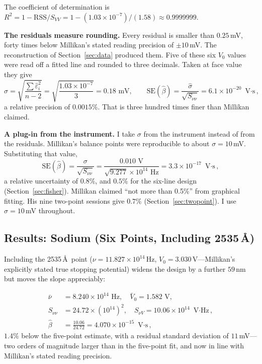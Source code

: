 \documentclass[12pt]{article}
\begin{document}
\noindent The coefficient of determination is
$R^2 = 1 - \mathrm{RSS}/S_{VV} = 1 - (1.03\times10^{-7})/(1.58) \approx
0.9999999$.

\medskip\noindent\textbf{The residuals measure rounding.}
Every residual is smaller than $0.25$\,mV, forty times below Millikan's
stated reading precision of $\pm10$\,mV.  The reconstruction of
Section~\ref{sec:data} produced them.  Five of these six $V_0$ values were
read off a fitted line and rounded to three decimals.  Taken at face value
they give
\[
  \hat\sigma = \sqrt{\frac{\sum\hat\varepsilon_i^2}{n-2}}
  = \sqrt{\frac{1.03\times10^{-7}}{3}} = 0.18\text{ mV},
  \qquad
  \mathrm{SE}(\hat\beta) = \frac{\hat\sigma}{\sqrt{S_{\nu\nu}}}
  = 6.1\times10^{-20}\text{ V$\cdot$s},
\]
a relative precision of $0.0015\%$.  That is three hundred times finer than
Millikan claimed.

\medskip\noindent\textbf{A plug-in from the instrument.}
I take $\sigma$ from the instrument instead of from the residuals.  Millikan's
balance points were reproducible to about $\sigma = 10$\,mV.  Substituting
that value,
\begin{equation}\label{eq:se_honest}
  \mathrm{SE}(\hat\beta) = \frac{\sigma}{\sqrt{S_{\nu\nu}}}
  = \frac{0.010\text{ V}}{\sqrt{9.277}\times10^{14}\text{ Hz}}
  = 3.3\times10^{-17}\text{ V$\cdot$s},
\end{equation}
a relative uncertainty of $0.8\%$, and $0.5\%$ for the six-line design
(Section~\ref{sec:fisher}).  Millikan claimed ``not more than 0.5\%'' from
graphical fitting.  His nine two-point sessions give $0.7\%$
(Section~\ref{sec:twopoint}).  I use $\sigma = 10$\,mV throughout.

\subsection{Results: Sodium (Six Points, Including 2535\,\AA)}

Including the 2535\,\AA\ point ($\nu = 11.827\times10^{14}$\,Hz,
$V_0 = 3.030$\,V---Millikan's explicitly stated true stopping potential)
widens the design by a further $59$\,nm but moves the slope appreciably:

\begin{align*}
  \bar\nu &= 8.240\times10^{14}\text{ Hz},\quad
  \bar V_0 = 1.582\text{ V}, \\
  S_{\nu\nu} &= 24.72\times(10^{14})^2, \quad
  S_{\nu V} = 10.06\times10^{14}\text{ V$\cdot$Hz}, \\
  \hat\beta &= \frac{10.06}{24.72} = 4.070\times10^{-15}\text{ V$\cdot$s},
\end{align*}
$1.4\%$ below the five-point estimate, with a residual standard deviation of
$11$\,mV---two orders of magnitude larger than in the five-point fit, and now
in line with Millikan's stated reading precision.
\end{document}
